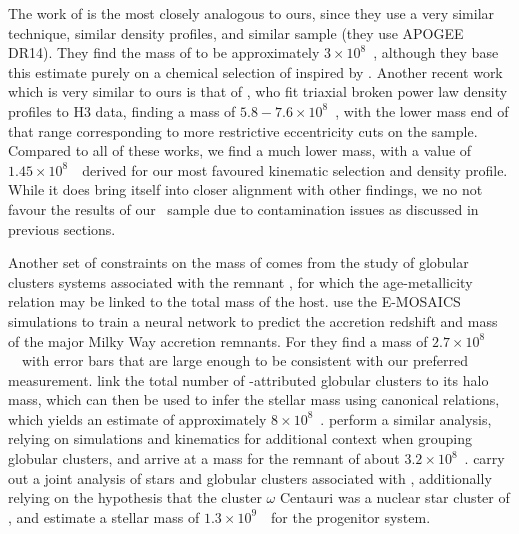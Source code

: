 The work of \cite{mackereth20} is the most closely analogous to ours, since they use a very similar technique, similar density profiles, and similar sample (they use APOGEE DR14). They find the mass of \gse to be approximately $3\times10^{8}$~\Msun, although they base this estimate purely on a chemical selection of \gse inspired by \textcite{mackereth19a}. Another recent work which is very similar to ours is that of \textcite{han22}, who fit triaxial broken power law density profiles to H3 data, finding a mass of $5.8-7.6\times10^{8}$~\Msun, with the lower mass end of that range corresponding to more restrictive eccentricity cuts on the \gse sample. Compared to all of these works, we find a much lower mass, with a value of $1.45\times10^{8}$~\Msun\ derived for our most favoured kinematic selection and density profile. While it does bring itself into closer alignment with other findings, we no not favour the results of our \JRLz\ sample due to contamination issues as discussed in previous sections.

Another set of constraints on the mass of \gse comes from the study of globular clusters systems associated with the remnant \parencite[as tabulated by e.g.][]{myeong18,massari19}, for which the age-metallicity relation may be linked to the total mass of the host. \textcite{kruijssen20} use the E-MOSAICS simulations to train a neural network to predict the accretion redshift and mass of the major Milky Way accretion remnants. For \gse they find a mass of $2.7\times 10^{8}$~\Msun\ with error bars that are large enough to be consistent with our preferred measurement. \textcite{forbes20} link the total number of \gse-attributed globular clusters to its halo mass, which can then be used to infer the stellar mass using canonical relations, which yields an estimate of approximately $8\times10^{8}$~\Msun . \textcite{callingham22} perform a similar analysis, relying on simulations and kinematics for additional context when grouping \gse globular clusters, and arrive at a mass for the remnant of about $3.2\times10^{8}$~\Msun. \textcite{limberg22} carry out a joint analysis of stars and globular clusters associated with \gse, additionally relying on the hypothesis that the cluster $\omega$ Centauri was a nuclear star cluster of \gse, and estimate a stellar mass of $1.3\times 10^{9}$~\Msun\ for the progenitor system.

